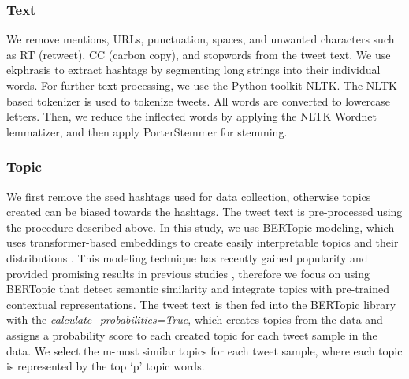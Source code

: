 \documentclass[letterpaper]{article} %
\begin{document}
\subsubsection{Text}  We remove mentions, URLs, punctuation, spaces, and unwanted characters such as RT (retweet), CC (carbon copy), and stopwords from the tweet text. We use ekphrasis \cite{baziotis2017datastories} to extract hashtags by segmenting long strings into their individual words. For further text processing, we use the Python toolkit NLTK. The NLTK-based tokenizer is used to tokenize tweets. All words are converted to lowercase letters. Then, we reduce the inflected words by applying the NLTK Wordnet lemmatizer, and then apply PorterStemmer for stemming.
\subsubsection{Topic} We first remove the seed hashtags used for data collection, otherwise topics created can be biased towards the hashtags. The tweet text is pre-processed using the procedure described above. In this study, we use BERTopic modeling, which uses transformer-based embeddings to create easily interpretable topics and their distributions \cite{grootendorst2020bertopic}. This modeling technique has recently gained popularity and provided promising results in previous studies \cite{anwar2021analyzing}, therefore we focus on using BERTopic that detect semantic similarity and integrate topics with pre-trained contextual representations. The tweet text is then fed into the BERTopic library with the \textit{calculate\_probabilities=True}, which creates topics from the data and assigns a probability score to each created topic for each tweet sample in the data. We select the m-most similar topics for each tweet sample, where each topic is represented by the top `p' topic words.
\end{document}
